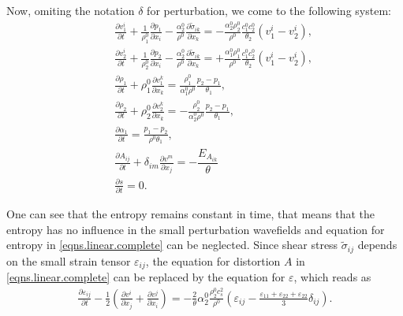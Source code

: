 \documentclass[3p,times]{elsarticle}
\begin{document}
Now, omiting the notation $\delta$ for perturbation, we come to the following system:
\begin{eqnarray}\label{eqns.linear.complete}
&&\frac{\partial v^i_1}{\partial t}+
\frac{1}{\rho_1^0}\frac{\partial p_1}{\partial x_i}- \frac{\alpha_2^0}{\rho^0}
\frac{\partial \tilde \sigma_{ik}}{\partial x_k}
=-\frac{\alpha_2^0 \rho_2^0}{\rho^0}\frac{c_1^0c_2^0}{\theta_2}(v_1^i-v_2^i), \nonumber \\
&&\frac{\partial v^i_2}{\partial t}+
\frac{1}{\rho_2^0}\frac{\partial p_2}{\partial x_i}- \frac{\alpha_2^0}{\rho^0}
\frac{\partial \tilde \sigma_{ik}}{\partial x_k}
=+\frac{\alpha_1^0 \rho_1^0}{\rho^0}\frac{c_1^0c_2^0}{\theta_2}(v_1^i-v_2^i), \nonumber \\
%
&&\frac{\partial \rho_1}{\partial t}+\rho_1^0 \frac{\partial v^k_1}{\partial x_k}=
\frac{\rho_1^0}{\alpha_1^0 \rho^0} \frac{p_2-p_1}{\theta_1},   \\
&&\frac{\partial \rho_2}{\partial t}+\rho_2^0 \frac{\partial v^k_2}{\partial x_k}=
-\frac{\rho_2^0}{\alpha_2^0 \rho^0} \frac{p_2-p_1}{\theta_1},  \nonumber \\
&&\frac{\partial \alpha_1}{\partial t}= \frac{p_1-p_2}{\rho^0 \theta_1},  \nonumber \\
&&\frac{\partial A_{i j}}{\partial t}+\delta_{im}\frac{\partial v^m}{\partial x_j}
=-\dfrac{ E_{A_{ik}} }{\theta} \nonumber \\
&&\frac{\partial s}{\partial t}=0. \nonumber 
\end{eqnarray}

One can see that the entropy remains constant in time, that means that the entropy 
has no influence in the small perturbation wavefields and equation for entropy in \eqref{eqns.linear.complete} can be neglected. Since shear stress $\tilde \sigma_{ij}$ depends on the small strain tensor $\varepsilon_{ij}$,  the equation for distortion $A$ in \eqref{eqns.linear.complete} can be replaced by the equation for $\varepsilon$, which reads as
\begin{align}
\frac{\partial \varepsilon_{ij}}{\partial t} - 
\frac{1}{2}\left(\frac{\partial v^i}{\partial x_j}+\frac{\partial v^j}{\partial x_i} \right) = 
-\frac{2}{\theta}\alpha_2^0 \frac{\rho_2^0 c^2_s}{\rho^0} \left(\varepsilon_{ij}-\frac{\varepsilon_{11}+\varepsilon_{22}+\varepsilon_{22}}{3}\delta_{ij}\right).
\end{align}
\end{document}
